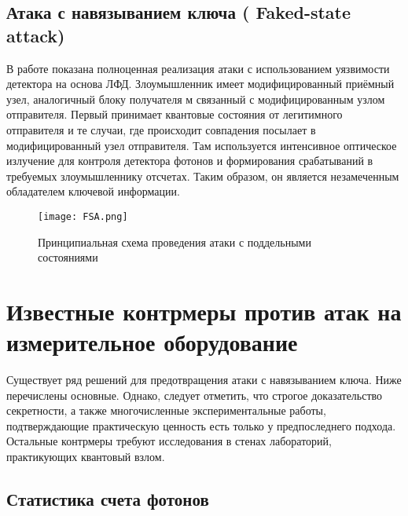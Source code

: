 \subsection{Атака с навязыванием ключа ( Faked-state attack)} \label{subsec:ch1/sec6/sub5}


В работе показана полноценная реализация атаки с использованием уязвимости детектора на основа ЛФД. Злоумышленник имеет модифицированный приёмный узел, аналогичный блоку получателя м связанный с модифицированным узлом отправителя. Первый принимает квантовые состояния от легитимного отправителя и те случаи, где происходит совпадения посылает в модифицированный узел отправителя. Там используется интенсивное оптическое излучение для контроля детектора фотонов и формирования срабатываний в требуемых злоумышленнику отсчетах. Таким образом, он является незамеченным обладателем ключевой информации. 

 \begin{figure}[ht]
  \centering
  \texttt{[image: FSA.png]}
  \caption{Принципиальная схема проведения атаки с поддельными состояниями}
  \label{fig:FSA}
\end{figure}

\pagebreak



\section{Известные контрмеры против атак на измерительное оборудование} \label{sec:ch1/sec7}

Существует ряд решений для предотвращения атаки с навязыванием ключа. Ниже перечислены основные. Однако, следует отметить, что строгое доказательство секретности, а также многочисленные экспериментальные работы, подтверждающие практическую ценность есть только у предпоследнего подхода. Остальные контрмеры требуют исследования в стенах лабораторий, практикующих квантовый взлом. 

\subsection{Статистика счета фотонов} \label{subsec:ch1/sec7/sub1}

